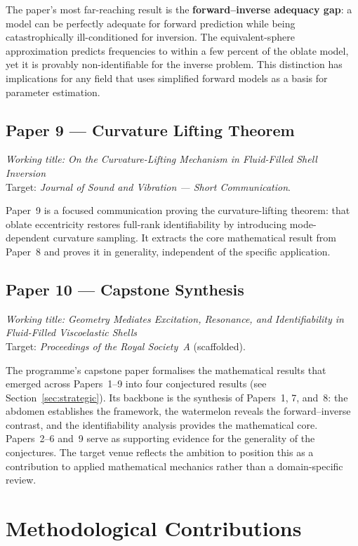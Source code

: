 \documentclass[11pt,a4paper]{article}
\begin{document}
The paper's most far-reaching result is the \textbf{forward--inverse adequacy gap}: a model can be perfectly adequate for forward prediction while being catastrophically ill-conditioned for inversion. The equivalent-sphere approximation predicts frequencies to within a few percent of the oblate model, yet it is provably non-identifiable for the inverse problem. This distinction has implications for any field that uses simplified forward models as a basis for parameter estimation.

\subsection{Paper 9 --- Curvature Lifting Theorem}

\emph{Working title: On the Curvature-Lifting Mechanism in Fluid-Filled Shell Inversion}\\
Target: \emph{Journal of Sound and Vibration --- Short Communication}.

Paper~9 is a focused communication proving the curvature-lifting theorem: that oblate eccentricity restores full-rank identifiability by introducing mode-dependent curvature sampling. It extracts the core mathematical result from Paper~8 and proves it in generality, independent of the specific application.

\subsection{Paper 10 --- Capstone Synthesis}

\emph{Working title: Geometry Mediates Excitation, Resonance, and Identifiability in Fluid-Filled Viscoelastic Shells}\\
Target: \emph{Proceedings of the Royal Society~A} (scaffolded).

The programme's capstone paper formalises the mathematical results that emerged across Papers~1--9 into four conjectured results (see Section~\ref{sec:strategic}). Its backbone is the synthesis of Papers~1, 7, and~8: the abdomen establishes the framework, the watermelon reveals the forward--inverse contrast, and the identifiability analysis provides the mathematical core. Papers~2--6 and~9 serve as supporting evidence for the generality of the conjectures. The target venue reflects the ambition to position this as a contribution to applied mathematical mechanics rather than a domain-specific review.

\section{Methodological Contributions}
\end{document}
